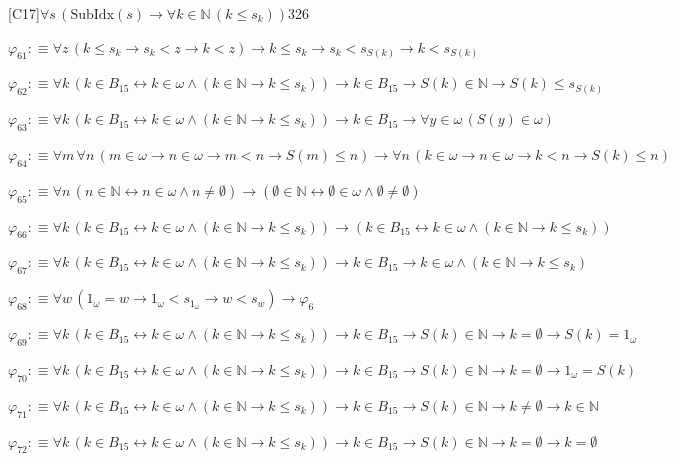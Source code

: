 \begin{fullproof}{[C17]}{$\forall s\,(\mathrm{SubIdx}(s) \to \forall k \in \mathbb{N}\,(k \leq s_{k}))$}{326}
\begin{abbrevlist}
\item $\varphi_{61} :\equiv \forall z\,(k \leq s_{k} \to s_{k} < z \to k < z) \to k \leq s_{k} \to s_{k} < s_{S(k)} \to k < s_{S(k)}$
\item $\varphi_{62} :\equiv \forall k\,(k \in B_{15} \leftrightarrow k \in \omega \land (k \in \mathbb{N} \to k \leq s_{k})) \to k \in B_{15} \to S(k) \in \mathbb{N} \to S(k) \leq s_{S(k)}$
\item $\varphi_{63} :\equiv \forall k\,(k \in B_{15} \leftrightarrow k \in \omega \land (k \in \mathbb{N} \to k \leq s_{k})) \to k \in B_{15} \to \forall y \in \omega\,(S(y) \in \omega)$
\item $\varphi_{64} :\equiv \forall m\,\forall n\,(m \in \omega \to n \in \omega \to m < n \to S(m) \leq n) \to \forall n\,(k \in \omega \to n \in \omega \to k < n \to S(k) \leq n)$
\item $\varphi_{65} :\equiv \forall n\,(n \in \mathbb{N} \leftrightarrow n \in \omega \land n \neq \emptyset) \to (\emptyset \in \mathbb{N} \leftrightarrow \emptyset \in \omega \land \emptyset \neq \emptyset)$
\item $\varphi_{66} :\equiv \forall k\,(k \in B_{15} \leftrightarrow k \in \omega \land (k \in \mathbb{N} \to k \leq s_{k})) \to (k \in B_{15} \leftrightarrow k \in \omega \land (k \in \mathbb{N} \to k \leq s_{k}))$
\item $\varphi_{67} :\equiv \forall k\,(k \in B_{15} \leftrightarrow k \in \omega \land (k \in \mathbb{N} \to k \leq s_{k})) \to k \in B_{15} \to k \in \omega \land (k \in \mathbb{N} \to k \leq s_{k})$
\item $\varphi_{68} :\equiv \forall w\,(1_{\omega} = w \to 1_{\omega} < s_{1_{\omega}} \to w < s_{w}) \to \varphi_{6}$
\item $\varphi_{69} :\equiv \forall k\,(k \in B_{15} \leftrightarrow k \in \omega \land (k \in \mathbb{N} \to k \leq s_{k})) \to k \in B_{15} \to S(k) \in \mathbb{N} \to k = \emptyset \to S(k) = 1_{\omega}$
\item $\varphi_{70} :\equiv \forall k\,(k \in B_{15} \leftrightarrow k \in \omega \land (k \in \mathbb{N} \to k \leq s_{k})) \to k \in B_{15} \to S(k) \in \mathbb{N} \to k = \emptyset \to 1_{\omega} = S(k)$
\item $\varphi_{71} :\equiv \forall k\,(k \in B_{15} \leftrightarrow k \in \omega \land (k \in \mathbb{N} \to k \leq s_{k})) \to k \in B_{15} \to S(k) \in \mathbb{N} \to k \neq \emptyset \to k \in \mathbb{N}$
\item $\varphi_{72} :\equiv \forall k\,(k \in B_{15} \leftrightarrow k \in \omega \land (k \in \mathbb{N} \to k \leq s_{k})) \to k \in B_{15} \to S(k) \in \mathbb{N} \to k = \emptyset \to k = \emptyset$

\end{abbrevlist}
\end{fullproof}
